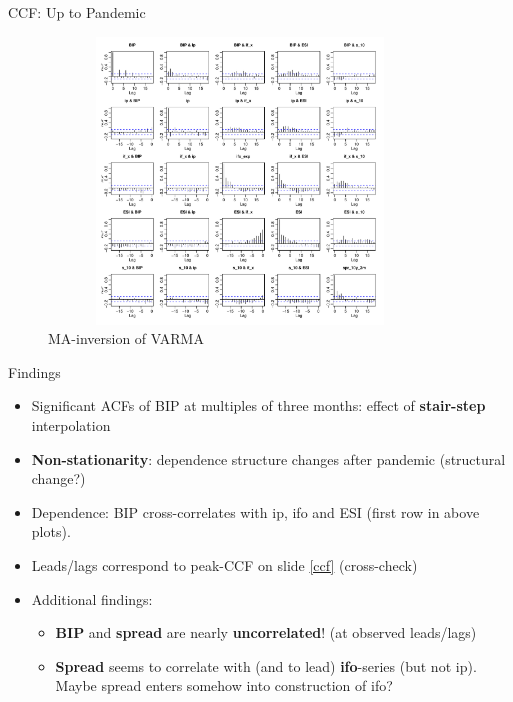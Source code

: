 \documentclass{beamer}
\begin{document}
\begin{frame} {CCF: Up to Pandemic}\label{ccf_pand_mult}
\begin{figure}[H]\begin{center}\includegraphics[height=3in, width=4in]{acf_pan.pdf}\caption{MA-inversion of VARMA\label{cor}}\end{center}\end{figure}\end{frame}

\begin{frame} {Findings}\label{slide_findings_ccf_mult}
\begin{itemize}
\item Significant ACFs of BIP at multiples of three months: effect of \textbf{stair-step} interpolation
\item \textbf{Non-stationarity}: dependence structure changes after pandemic (structural change?)
\item Dependence: BIP cross-correlates with ip, ifo and ESI (first row in above plots). 
\item Leads/lags correspond to peak-CCF on slide \eqref{ccf} (cross-check)
\item Additional findings: 
\begin{itemize}
\item \textbf{BIP} and \textbf{spread} are nearly \textbf{uncorrelated}! (at observed leads/lags) 
\item \textbf{Spread} seems to correlate with (and to lead) \textbf{ifo}-series (but not ip). Maybe spread enters somehow into construction of ifo?
\end{itemize}
\end{itemize}

\end{frame}
\end{document}
